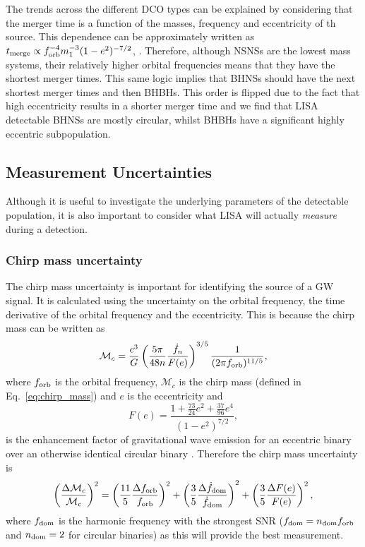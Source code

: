 The trends across the different DCO types can be explained by considering that the merger time is a function of the masses, frequency and eccentricity of th source. This dependence can be approximately written as $t_{\rm merge} \propto f_{\rm orb}^{-4} m_1^{-3} (1 - e^2)^{-7/2}$,  \citep[][Eq.~5.14]{Peters+1964}. Therefore, although NSNSs are the lowest mass systems, their relatively higher orbital frequencies means that they have the shortest merger times. This same logic implies that BHNSs should have the next shortest merger times and then BHBHs. This order is flipped due to the fact that high eccentricity results in a shorter merger time and we find that LISA detectable BHNSs are mostly circular, whilst BHBHs have a significant highly eccentric subpopulation.

\subsection{Measurement Uncertainties}\label{sec:measurement_uncertainties}
Although it is useful to investigate the underlying parameters of the detectable population, it is also important to consider what LISA will actually \textit{measure} during a detection.

\subsubsection{Chirp mass uncertainty}

The chirp mass uncertainty is important for identifying the source of a GW signal. It is calculated using the uncertainty on the orbital frequency, the time derivative of the orbital frequency and the eccentricity. This is because the chirp mass can be written as
\begin{equation}
    \mathcal{M}_c = \frac{c^3}{G} \left( \frac{5 \pi}{48 n} \frac{\dot{f}_{n}}{F(e)} \right)^{3/5} \frac{1}{(2 \pi f_{\rm orb})^{11/5}},
\end{equation}
where $f_{\rm orb}$ is the orbital frequency, $\mathcal{M}_{c}$ is the chirp mass (defined in Eq.~\ref{eq:chirp_mass}) and $e$ is the eccentricity and
\begin{equation}
    F(e) = \frac{1 + \frac{73}{24} e^2 + \frac{37}{96} e^4}{(1 - e^2)^{7/2}},
\end{equation}
is the enhancement factor of gravitational wave emission for an eccentric binary over an otherwise identical circular binary \citep[][Eq.~17]{Peters+1963}. Therefore the chirp mass uncertainty is
\begin{equation}\label{eq:chirp_mass_uncertainty}
    \qty( \frac{\Delta \mathcal{M}_c}{\mathcal{M}_c} )^2 = \left( \frac{11}{5} \frac{\Delta f_{\rm orb}}{f_{\rm orb}} \right)^2 + \left( \frac{3}{5} \frac{\Delta \dot{f}_{\rm dom}}{\dot{f}_{\rm dom}} \right)^2 + \left( \frac{3}{5} \frac{\Delta F(e)}{F(e)} \right)^2,
\end{equation}
where $f_{\rm dom}$ is the harmonic frequency with the strongest SNR ($f_{\rm dom} = n_{\rm dom} f_{\rm orb}$ and $n_{\rm dom} = 2$ for circular binaries) as this will provide the best measurement.

